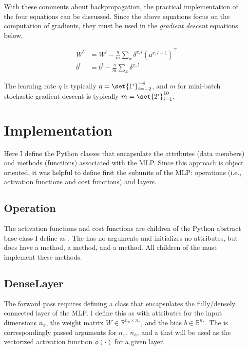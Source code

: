 \documentclass{article}
\DeclarePairedDelimiter\set\{\}
\begin{document}
With these comments about backpropagation,
the practical implementation of the four equations can be discussed.
Since the above equations focus on the computation of gradients,
they must be used in the \textit{gradient descent} equations below.

\begin{align}
	W^{l} & = W^{l} - \frac{\eta}{m} \sum_{x}{\delta^{x, l}(a^{x, l-1})^\top} \\
	b^{l} & = b^{l} - \frac{\eta}{m} \sum_{x}{\delta^{x, l}}
\end{align}

The learning rate $\eta$ is typically $\eta = \set{1^{i}}_{i=-2}^{-4}$, and $m$
for mini-batch stochastic gradient descent is typically
$m = \set{2^{i}}_{i=1}^{10}$.

\section{Implementation}

Here I define the Python classes
that encapsulate the attributes (data members) and methods (functions) associated
with the MLP. Since this approach is object oriented, it was helpful to
define first the subunits of the MLP: operations (i.e., activation functions and
cost functions) and layers.

\subsection{Operation}

The activation functions and cost functions are children of the Python
abstract base class I define as . The
 has no arguments and initializes no attributes, but
does have a  method, a  method, and
a  method. All
children of the  must implement these methods.

\subsection{DenseLayer}

The forward pass requires defining a class that
encapsulates the fully/densely connected layer of the MLP. I define this as
 with attributes for the input dimensions $n_x$,
the weight matrix $W \in \mathbb{R}^{n_h \times n_x}$, and the bias
${b \in \mathbb{R}^{n_h}}$. The  is correspondingly passed
arguments for $n_x$, $n_h$, and a 
that will be used as the vectorized activation function $\phi(\cdot)$ for a given layer.
\end{document}
